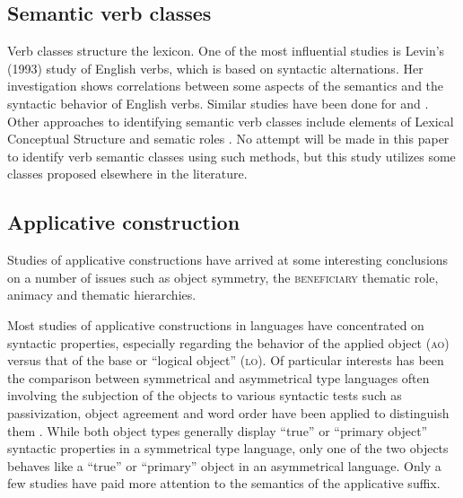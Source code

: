 \documentclass[output=paper]{langsci/langscibook}
\begin{document}
\subsection{Semantic verb classes}\label{sec:sibanda:2.2}

Verb classes structure the lexicon. One of the most influential studies is Levin’s (1993) study of English verbs, which is based on syntactic alternations. Her investigation shows correlations between some aspects of the semantics and the syntactic behavior of English verbs. Similar studies have been done for  \citep{VazquezEtAl2000} and  \citep{Schumacher1986,SchulteimWaldeBrew2002}. Other approaches to identifying semantic verb classes include elements of Lexical Conceptual Structure \citep{Gruber1965,Jackendoff1983,Jackendoff1990} and sematic roles \citep{Chafe1970,Cook1979,Longacre1976,FoleyVanValin1984,VanValin1993}. No attempt will be made in this paper to identify  verb semantic classes using such methods, but this study utilizes some classes proposed elsewhere in the literature.

\subsection{Applicative construction} \label{sec:sibanda:2.3}

Studies of  applicative constructions have arrived at some interesting conclusions on a number of issues such as object symmetry, the \textsc{beneficiary} thematic role, animacy and thematic hierarchies. 

Most studies of applicative constructions in  languages have concentrated on syntactic properties, especially regarding the behavior of the applied object (\textsc{ao}) versus that of the base or “logical object” (\textsc{lo}). Of particular interests has been the comparison between symmetrical and asymmetrical type languages often involving the subjection of the objects to various syntactic tests such as passivization, object agreement and word order have been applied to distinguish them \citep{BresnanMoshi1990,NgonyaniGithinji2006,Pylkkanen2000,Machobane1989,AlsinaMchombo1993,Baker1988,Harford1993,Ngonyani1996}. While both object types generally display “true” or “primary object” syntactic properties in a symmetrical type language, only one of the two objects behaves like a “true” or “primary” object in an asymmetrical language. Only a few studies have paid more attention to the semantics of the applicative suffix. 
\end{document}

